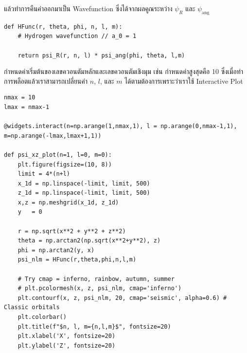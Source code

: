 \noindent แล้วทำการคืนค่าออกมาเป็น Wavefunction ซึ่งได้จากผลคูณระหว่าง $\psi_{R}$ และ $\psi_{\text{ang}}$

\begin{lstlisting}[style=MyPython]
def HFunc(r, theta, phi, n, l, m):
    # Hydrogen wavefunction // a_0 = 1

    return psi_R(r, n, l) * psi_ang(phi, theta, l,m)
\end{lstlisting}

\vspace{1em}
\noindent กำหนดค่าเริ่มต้นของเลขควอนตัมหลักและเลขควอนตัมเชิงมุม เช่น กำหนดค่าสูงสุดคือ 10 ซึ่งเมื่อทำการพล็อตแล้วเราสามารถเปลี่ยนค่า $n$, $l$, และ $m$ ได้ตามต้องการเพราะว่าเราใช้ Interactive Plot

\begin{lstlisting}[style=MyPython]
nmax = 10
lmax = nmax-1

@widgets.interact(n=np.arange(1,nmax,1), l = np.arange(0,nmax-1,1), m=np.arange(-lmax,lmax+1,1))

def psi_xz_plot(n=1, l=0, m=0):
    plt.figure(figsize=(10, 8))
    limit = 4*(n+l)
    x_1d = np.linspace(-limit, limit, 500)
    z_1d = np.linspace(-limit, limit, 500)
    x,z = np.meshgrid(x_1d, z_1d)
    y   = 0
    
    r = np.sqrt(x**2 + y**2 + z**2)
    theta = np.arctan2(np.sqrt(x**2+y**2), z)
    phi = np.arctan2(y, x)
    psi_nlm = HFunc(r,theta,phi,n,l,m)
    
    # Try cmap = inferno, rainbow, autumn, summer
    # plt.pcolormesh(x, z, psi_nlm, cmap='inferno')
    plt.contourf(x, z, psi_nlm, 20, cmap='seismic', alpha=0.6) # Classic orbitals
    plt.colorbar()
    plt.title(f"$n, l, m={n,l,m}$", fontsize=20)
    plt.xlabel('X', fontsize=20)
    plt.ylabel('Z', fontsize=20)
\end{lstlisting}

\medskip

